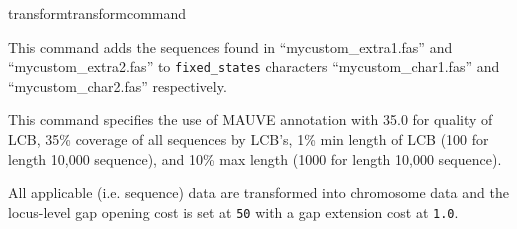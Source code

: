 \begin{command}{transform}{transformcommand}
\begin{poyexamples}
            {This command adds the sequences found in ``mycustom\_extra1.fas'' and ``mycustom\_extra2.fas'' 
            to \texttt{fixed\_states} characters 
            ``mycustom\_char1.fas'' and ``mycustom\_char2.fas'' respectively.}
                 
            {This command specifies the use of MAUVE annotation with 35.0 for quality of LCB,
            35\% coverage of all sequences by LCB's, 1\% min length of LCB (100 for length 10,000 
            sequence), and 10\% max length (1000 for length 10,000 sequence).}
        
          
          
            {All applicable (i.e. sequence) data are transformed into chromosome data 
            and the locus-level gap opening cost is set at \texttt{50} with a gap extension cost at \texttt{1.0}.}
                                
    \end{poyexamples}        

\end{command}




